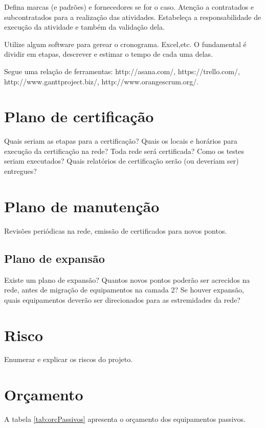 \documentclass[	DIV=calc,%
							paper=a4,%
							fontsize=12pt,%
							onecolumn]{scrartcl}	 					%
\begin{document}
Defina marcas (e padrões) e fornecedores se for o caso. Atenção a contratados e subcontratados para a realização das atividades. Estabeleça a responsabilidade de execução da atividade e também da validação dela.

Utilize algum software para gerear o cronograma. Excel,etc. O fundamental é dividir em etapas, descrever e estimar o tempo de cada uma delas.

Segue uma relação de ferramentas:
http://asana.com/, 
https://trello.com/, 
http://www.ganttproject.biz/, 
http://www.orangescrum.org/. 

\section{Plano de certificação}
Quais seriam as etapas para a certificação? 
Quais os locais e horários para execução da certificação na rede? Toda rede será certificada?
Como os testes seriam executados?
Quais relatórios de certificação serão (ou deveriam ser) entregues? 

\section{Plano de manutenção}

Revisões periódicas na rede, emissão de certificados para novos pontos.

\subsection{Plano de expansão}
Existe um plano de expansão? Quantos novos pontos poderão ser acrecidos na rede, antes de migração de equipamentos na camada 2? Se houver expansão, quais equipamentos deverão ser direcionados para as estremidades da rede? 

\section{Risco}
Enumerar e explicar os riscos do projeto.

\section{Orçamento}

A tabela \ref{tab:orcPassivos} apresenta o orçamento dos equipamentos passivos.
\end{document}
